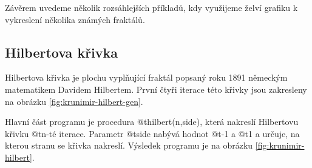 Závěrem uvedeme několik rozsáhlejších příkladů, kdy využijeme želví grafiku k
vykreslení několika známých fraktálů. 

\subsection{Hilbertova křivka}

Hilbertova křivka je plochu vyplňující fraktál popsaný roku 1891 německým
matematikem Davidem Hilbertem. \cite{wiki:hilbert-curve} První čtyři iterace
této křivky jsou zakresleny na obrázku \ref{fig:krunimir-hilbert-gen}.

Hlavní část programu je procedura @t{hilbert(n,side)}, která nakreslí Hilbertovu
křivku @t{n}-té iterace. Parametr @t{side} nabývá hodnot @t{-1} a @t{1} a
určuje, na kterou stranu se křivka nakreslí. Výsledek programu je na obrázku
\ref{fig:krunimir-hilbert}.



